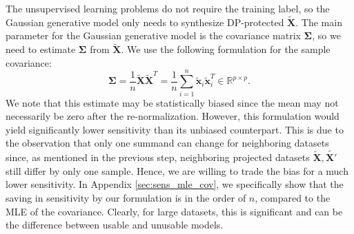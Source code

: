 \documentclass[USenglish,oneside,twocolumn]{article}
\theoremstyle{definition}
\theoremstyle{remark}
\theoremstyle{plain}
\theoremstyle{plain}
\begin{document}
The unsupervised learning problems do not require the training label, so the Gaussian generative model only
needs to synthesize DP-protected $\widetilde{\mathbf{X}}$. The main
parameter for the Gaussian generative model is the covariance matrix
$\boldsymbol{\Sigma}$, so we need to estimate $\boldsymbol{\Sigma}$
from $\widetilde{\mathbf{X}}$. We use the following formulation for
the sample covariance:
\begin{equation}
\boldsymbol{\Sigma}=\frac{1}{n}\widetilde{\mathbf{X}}\widetilde{\mathbf{X}}^{T}=\frac{1}{n}\sum_{i=1}^{n}\widetilde{\mathbf{x}}_{i}\widetilde{\mathbf{x}}_{i}^{T}\in\mathbb{R}^{p\times p}.\label{eq:cov_est}
\end{equation}
We note that this estimate may be statistically biased since the mean
may not necessarily be zero after the re-normalization. However, this
formulation would yield significantly lower sensitivity than its unbiased
counterpart. This is due to the observation that only one summand can change
for neighboring datasets since, as mentioned in the previous step,
neighboring projected datasets $\widetilde{\mathbf{X}}, \widetilde{\mathbf{X}'}$ still differ by only one sample.
Hence, we are willing to trade the bias for a much lower sensitivity.
In Appendix \ref{sec:sens_mle_cov}, we specifically show that the
saving in sensitivity by our formulation is in the order of $n$,
compared to the MLE of the covariance. Clearly, for large datasets,
this is significant and can be the difference between usable and unusable
models.
\end{document}
